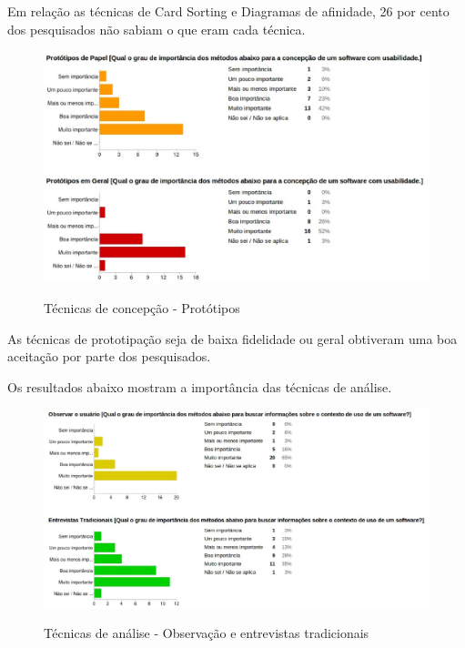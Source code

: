 	Em relação as técnicas de Card Sorting e Diagramas de afinidade, 26 por cento dos pesquisados não sabiam o que eram cada técnica. 
		
	\begin{figure}[!h]
    	\centering
    	\includegraphics[keepaspectratio=true,scale=0.55]
      		{figuras/concepcao3.eps}
    	\label{check04}
		\caption{Técnicas de concepção - Protótipos}
	\end{figure}
	
	As técnicas de prototipação seja de baixa fidelidade ou geral obtiveram uma boa aceitação por parte dos pesquisados.

\newpage

	Os resultados abaixo mostram a importância das técnicas de análise.
	
	\begin{figure}[!h]
    	\centering
    	\includegraphics[keepaspectratio=true,scale=0.50]
      		{figuras/analise1.eps}
    	\label{check04}
		\caption{Técnicas de análise - Observação e entrevistas tradicionais}
	\end{figure}
	
